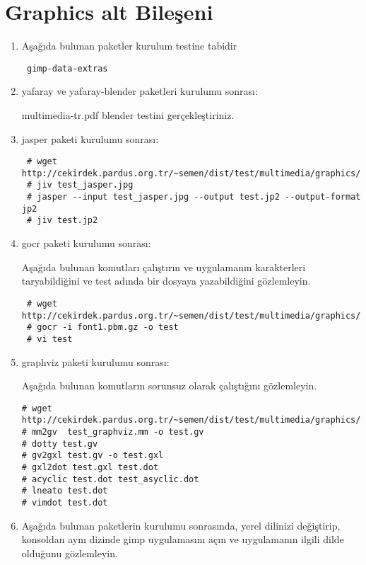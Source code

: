 \documentclass[a4paper,10pt]{article}
\begin{document}
\section{Graphics alt Bileşeni}
\begin{enumerate}
 \item Aşağıda bulunan paketler kurulum testine tabidir
\begin{verbatim}
 gimp-data-extras
\end{verbatim}

\item yafaray ve yafaray-blender paketleri kurulumu sonrası:

multimedia-tr.pdf blender testini gerçekleştiriniz.
\item jasper paketi kurulumu sonrası:

\begin{verbatim}
 # wget http://cekirdek.pardus.org.tr/~semen/dist/test/multimedia/graphics/test_jasper.jpg
 # jiv test_jasper.jpg
 # jasper --input test_jasper.jpg --output test.jp2 --output-format jp2
 # jiv test.jp2
\end{verbatim}


 \item gocr paketi kurulumu sonrası:

Aşağıda bulunan komutları çalıştırın ve uygulamanın karakterleri taryabildiğini ve test adında bir dosyaya yazabildiğini gözlemleyin.
\begin{verbatim}
 # wget http://cekirdek.pardus.org.tr/~semen/dist/test/multimedia/graphics/font1.pbm.gz
 # gocr -i font1.pbm.gz -o test
 # vi test
\end{verbatim}

\item graphviz paketi kurulumu sonrası:

Aşağıda bulunan komutların sorunsuz olarak çalıştığını gözlemleyin.
\begin{verbatim}
# wget http://cekirdek.pardus.org.tr/~semen/dist/test/multimedia/graphics/test_graphviz.mm
# mm2gv  test_graphviz.mm -o test.gv
# dotty test.gv
# gv2gxl test.gv -o test.gxl 
# gxl2dot test.gxl test.dot
# acyclic test.dot test_asyclic.dot
# lneato test.dot
# vimdot test.dot
\end{verbatim}




 \item Aşağıda bulunan paketlerin kurulumu sonrasında, yerel dilinizi değiştirip, konsoldan aynı dizinde gimp uygulamasını açın ve uygulamanın ilgili dilde olduğunu gözlemleyin.


\end{enumerate}
\end{document}
